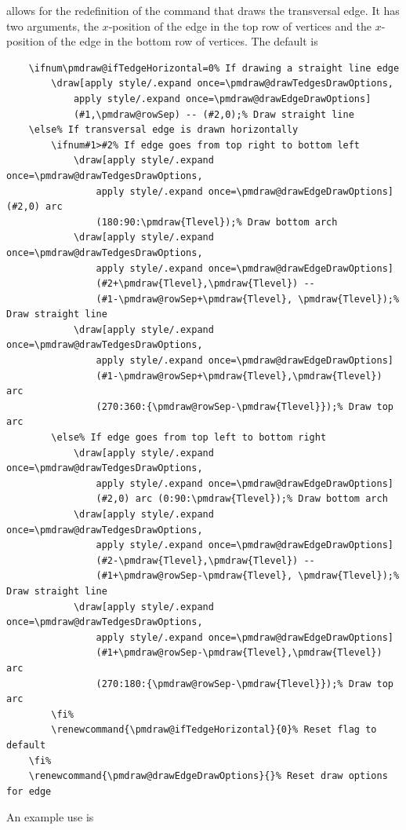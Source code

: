 \documentclass{ltxdoc}
\begin{document}
allows for the redefinition of the command that draws the transversal edge. It has two arguments, the \( x \)-position of the edge in the top row of vertices and the \( x \)-position of the edge in the bottom row of vertices. The default is
\begin{verbatim}
    \ifnum\pmdraw@ifTedgeHorizontal=0% If drawing a straight line edge
        \draw[apply style/.expand once=\pmdraw@drawTedgesDrawOptions,
            apply style/.expand once=\pmdraw@drawEdgeDrawOptions] 
            (#1,\pmdraw@rowSep) -- (#2,0);% Draw straight line
    \else% If transversal edge is drawn horizontally
        \ifnum#1>#2% If edge goes from top right to bottom left
            \draw[apply style/.expand once=\pmdraw@drawTedgesDrawOptions,
                apply style/.expand once=\pmdraw@drawEdgeDrawOptions] (#2,0) arc 
                (180:90:\pmdraw{Tlevel});% Draw bottom arch
            \draw[apply style/.expand once=\pmdraw@drawTedgesDrawOptions,
                apply style/.expand once=\pmdraw@drawEdgeDrawOptions] 
                (#2+\pmdraw{Tlevel},\pmdraw{Tlevel}) -- 
                (#1-\pmdraw@rowSep+\pmdraw{Tlevel}, \pmdraw{Tlevel});% Draw straight line
            \draw[apply style/.expand once=\pmdraw@drawTedgesDrawOptions,
                apply style/.expand once=\pmdraw@drawEdgeDrawOptions] 
                (#1-\pmdraw@rowSep+\pmdraw{Tlevel},\pmdraw{Tlevel}) arc 
                (270:360:{\pmdraw@rowSep-\pmdraw{Tlevel}});% Draw top arc
        \else% If edge goes from top left to bottom right
            \draw[apply style/.expand once=\pmdraw@drawTedgesDrawOptions,
                apply style/.expand once=\pmdraw@drawEdgeDrawOptions] 
                (#2,0) arc (0:90:\pmdraw{Tlevel});% Draw bottom arch
            \draw[apply style/.expand once=\pmdraw@drawTedgesDrawOptions,
                apply style/.expand once=\pmdraw@drawEdgeDrawOptions] 
                (#2-\pmdraw{Tlevel},\pmdraw{Tlevel}) -- 
                (#1+\pmdraw@rowSep-\pmdraw{Tlevel}, \pmdraw{Tlevel});% Draw straight line
            \draw[apply style/.expand once=\pmdraw@drawTedgesDrawOptions,
                apply style/.expand once=\pmdraw@drawEdgeDrawOptions] 
                (#1+\pmdraw@rowSep-\pmdraw{Tlevel},\pmdraw{Tlevel}) arc 
                (270:180:{\pmdraw@rowSep-\pmdraw{Tlevel}});% Draw top arc
        \fi%
        \renewcommand{\pmdraw@ifTedgeHorizontal}{0}% Reset flag to default
    \fi%
    \renewcommand{\pmdraw@drawEdgeDrawOptions}{}% Reset draw options for edge
\end{verbatim}
An example use is
\end{document}
